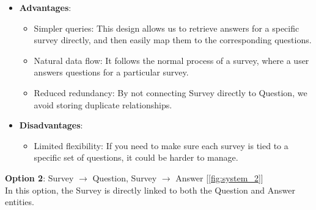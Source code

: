 \begin{itemize}
    \item \textbf{Advantages}:
    \begin{itemize}
        \item Simpler queries: This design allows us to retrieve answers for a specific survey directly, and then easily map them to the corresponding questions.
        \item Natural data flow: It follows the normal process of a survey, where a user answers questions for a particular survey.
        \item Reduced redundancy: By not connecting Survey directly to Question, we avoid storing duplicate relationships.
    \end{itemize}
    \item \textbf{Disadvantages}:
    \begin{itemize}
        \item Limited flexibility: If you need to make sure each survey is tied to a specific set of questions, it could be harder to manage.
    \end{itemize}
\end{itemize}

\vspace{5mm}

\noindent \textbf{Option 2}: Survey $\rightarrow$ Question, Survey $\rightarrow$ Answer [\ref{fig:system_2}] \\
In this option, the Survey is directly linked to both the Question and Answer entities.

